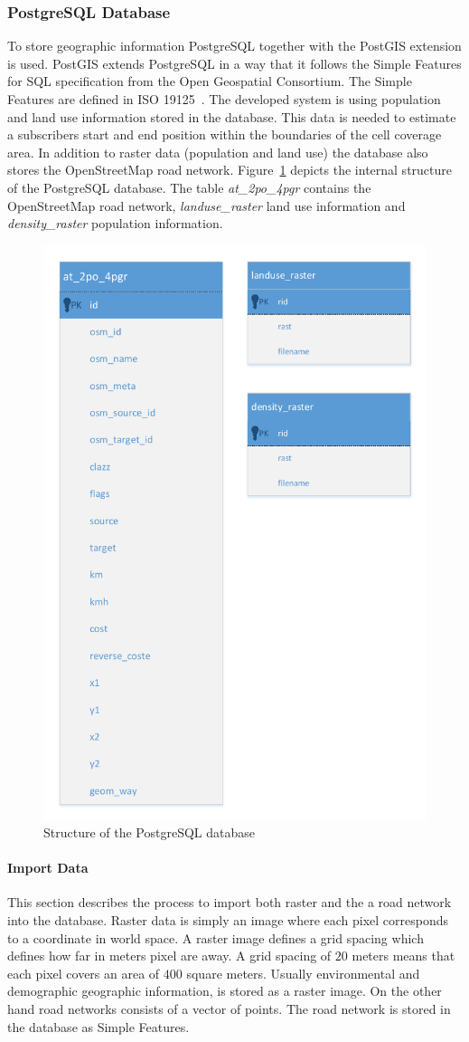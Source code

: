 \documentclass[master,english]{hgbthesis}
\begin{document}
\subsubsection{PostgreSQL Database}
To store geographic information PostgreSQL together with the PostGIS extension is used. PostGIS extends PostgreSQL in a way that it follows the Simple Features for SQL specification from the Open Geospatial Consortium. The Simple Features are defined in ISO 19125~\cite{ISO19125,ISO191252}. The developed system is using population and land use information stored in the database. This data is needed to estimate a subscribers start and end position within the boundaries of the cell coverage area. In addition to raster data (population and land use) the database also stores the OpenStreetMap road network. Figure~\ref{fig:pg_structure} depicts the internal structure of the PostgreSQL database. The table \emph{at_2po_4pgr} contains the OpenStreetMap road network, \emph{landuse_raster} land use information and \emph{density_raster} population information.
\begin{figure}
\centering
\includegraphics[width=0.7\linewidth]{./images/pg_structure}
\caption{Structure of the PostgreSQL database}
\label{fig:pg_structure}
\end{figure}
\paragraph{Import Data}
This section describes the process to import both raster and the a road network into the database. Raster data is simply an image where each pixel corresponds to a coordinate in world space. A raster image defines a grid spacing which defines how far in meters pixel are away. A grid spacing of $20$ meters means that each pixel covers an area of $400$ square meters. Usually environmental and demographic geographic information, is stored as a raster image. On the other hand road networks consists of a vector of points. The road network is stored in the database as Simple Features.
\end{document}
